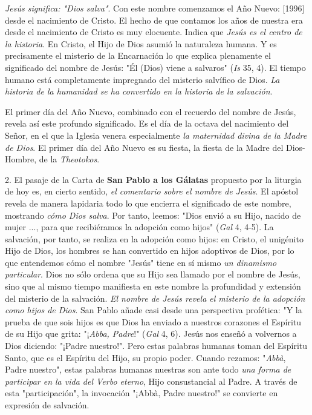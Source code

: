 \begin{body}
\emph{Jesús significa: "Dios salva"}. Con este nombre comenzamos el Año Nuevo: {[}1996{]} desde el nacimiento de Cristo. El hecho de que contamos los años de nuestra era desde el nacimiento de Cristo es muy elocuente. Indica que \emph{Jesús es el centro de la historia}. En Cristo, el Hijo de Dios asumió la naturaleza humana. Y es precisamente el misterio de la Encarnación lo que explica plenamente el significado del nombre de Jesús: "Él (Dios) viene a salvaros" (\emph{Is} 35, 4). El tiempo humano está completamente impregnado del misterio salvífico de Dios. \emph{La historia de la humanidad se ha convertido en la historia de la salvación}.

El primer día del Año Nuevo, combinado con el recuerdo del nombre de Jesús, revela así este profundo significado. Es el día de la octava del nacimiento del Señor, en el que la Iglesia venera especialmente \emph{la maternidad divina de la Madre de Dios}. El primer día del Año Nuevo es su fiesta, la fiesta de la Madre del Dios-Hombre, de la \emph{Theotokos}.

2. El pasaje de la Carta de \textbf{San Pablo a los Gálatas} propuesto por la liturgia de hoy es, en cierto sentido, \emph{el comentario sobre el nombre de Jesús}. El apóstol revela de manera lapidaria todo lo que encierra el significado de este nombre, mostrando \emph{cómo Dios salva}. Por tanto, leemos: "Dios envió a su Hijo, nacido de mujer ..., para que recibiéramos la adopción como hijos" (\emph{Gal} 4, 4-5). La salvación, por tanto, se realiza en la adopción como hijos: en Cristo, el unigénito Hijo de Dios, los hombres se han convertido en hijos adoptivos de Dios, por lo que entendemos cómo el nombre "Jesús" tiene en sí mismo \emph{un dinamismo particular}. Dios no sólo ordena que su Hijo sea llamado por el nombre de Jesús, sino que al mismo tiempo manifiesta en este nombre la profundidad y extensión del misterio de la salvación. \emph{El nombre de Jesús revela el misterio de la adopción como hijos de Dios}. San Pablo añade casi desde una perspectiva profética: "Y la prueba de que sois hijos es que Dios ha enviado a nuestros corazones el Espíritu de su Hijo que grita: "¡\emph{Abba, Padre}!" (\emph{Gal} 4, 6). Jesús nos enseñó a volvernos a Dios diciendo: "¡Padre nuestro!". Pero estas palabras humanas toman del Espíritu Santo, que es el Espíritu del Hijo, su propio poder. Cuando rezamos: "\emph{Abbà}, Padre nuestro", estas palabras humanas nuestras son ante todo \emph{una forma de participar en la vida del Verbo eterno}, Hijo consustancial al Padre. A través de esta "participación", la invocación "¡Abbà, Padre nuestro!" se convierte en expresión de salvación.


\end{body}
